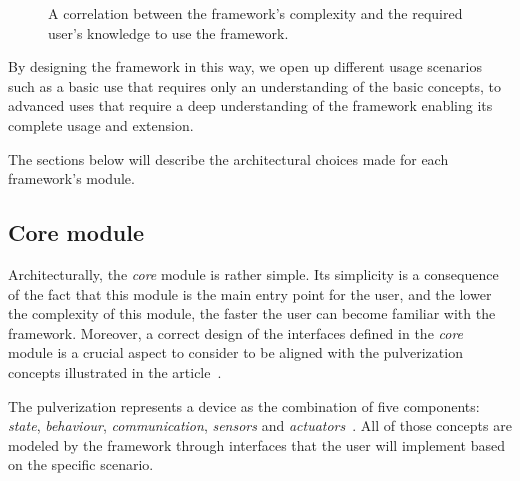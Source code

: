 \begin{figure}[ht]
	\centering
	\caption{A correlation between the framework's complexity and the required user's knowledge to use the framework.}
	\label{fig:pyramid-user-knowledge}
\end{figure}

By designing the framework in this way, we open up different usage scenarios such as a basic use that requires only an understanding of the
basic concepts, to advanced uses that require a deep understanding of the framework enabling its complete usage and extension.

The sections below will describe the architectural choices made for each framework's module.

\subsection{Core module}
\label{sec:core-module}

Architecturally, the \emph{core} module is rather simple. Its simplicity is a consequence of the fact that this module is the main entry point
for the user, and the lower the complexity of this module, the faster the user can become familiar with the framework.
Moreover, a correct design of the interfaces defined in the \emph{core} module is a crucial aspect to consider to be aligned with the
pulverization concepts illustrated in the article~\cite{fi12110203}.

The pulverization represents a device as the combination of five components: \emph{state}, \emph{behaviour}, \emph{communication},
\emph{sensors} and \emph{actuators}~\cite{fi12110203}.
All of those concepts are modeled by the framework through interfaces that the user will implement based on the specific scenario.

